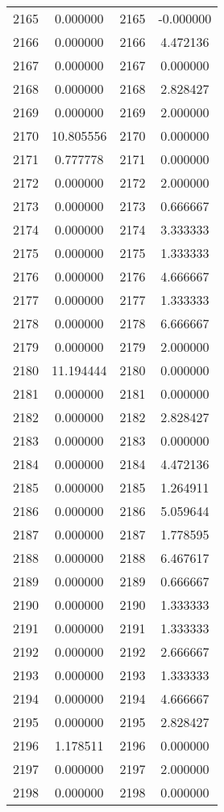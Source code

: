 \documentclass[12pt]{article}
\begin{document}
\begin{longtable}{@{}cccc@{}}
2165 & 0.000000 & 2165 & -0.000000 \\
2166 & 0.000000 & 2166 & 4.472136 \\
2167 & 0.000000 & 2167 & 0.000000 \\
2168 & 0.000000 & 2168 & 2.828427 \\
2169 & 0.000000 & 2169 & 2.000000 \\
2170 & 10.805556 & 2170 & 0.000000 \\
2171 & 0.777778 & 2171 & 0.000000 \\
2172 & 0.000000 & 2172 & 2.000000 \\
2173 & 0.000000 & 2173 & 0.666667 \\
2174 & 0.000000 & 2174 & 3.333333 \\
2175 & 0.000000 & 2175 & 1.333333 \\
2176 & 0.000000 & 2176 & 4.666667 \\
2177 & 0.000000 & 2177 & 1.333333 \\
2178 & 0.000000 & 2178 & 6.666667 \\
2179 & 0.000000 & 2179 & 2.000000 \\
2180 & 11.194444 & 2180 & 0.000000 \\
2181 & 0.000000 & 2181 & 0.000000 \\
2182 & 0.000000 & 2182 & 2.828427 \\
2183 & 0.000000 & 2183 & 0.000000 \\
2184 & 0.000000 & 2184 & 4.472136 \\
2185 & 0.000000 & 2185 & 1.264911 \\
2186 & 0.000000 & 2186 & 5.059644 \\
2187 & 0.000000 & 2187 & 1.778595 \\
2188 & 0.000000 & 2188 & 6.467617 \\
2189 & 0.000000 & 2189 & 0.666667 \\
2190 & 0.000000 & 2190 & 1.333333 \\
2191 & 0.000000 & 2191 & 1.333333 \\
2192 & 0.000000 & 2192 & 2.666667 \\
2193 & 0.000000 & 2193 & 1.333333 \\
2194 & 0.000000 & 2194 & 4.666667 \\
2195 & 0.000000 & 2195 & 2.828427 \\
2196 & 1.178511 & 2196 & 0.000000 \\
2197 & 0.000000 & 2197 & 2.000000 \\
2198 & 0.000000 & 2198 & 0.000000 \\

\end{longtable}
\end{document}
